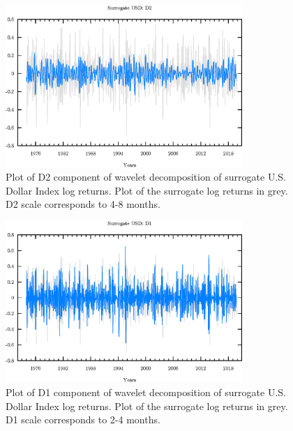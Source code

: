 \begin{figure}
\begin{center}
\includegraphics[width=0.8\textwidth]{./code/plot/surrogate_usd_wr_D2.eps}
\caption{Plot of D2 component of wavelet decomposition of surrogate U.S. Dollar Index log returns. 
	Plot of the surrogate log returns in grey. D2 scale corresponds to 4-8 months.}
\end{center}
\label{fig:s-usd-wr-d2}
\end{figure}

\begin{figure}
\begin{center}
\includegraphics[width=0.8\textwidth]{./code/plot/surrogate_usd_wr_D1.eps}
\caption{Plot of D1 component of wavelet decomposition of surrogate U.S. Dollar Index log returns. 
	Plot of the surrogate log returns in grey. D1 scale corresponds to 2-4 months.}
\end{center}
\label{fig:s-usd-wr-d1}
\end{figure}

